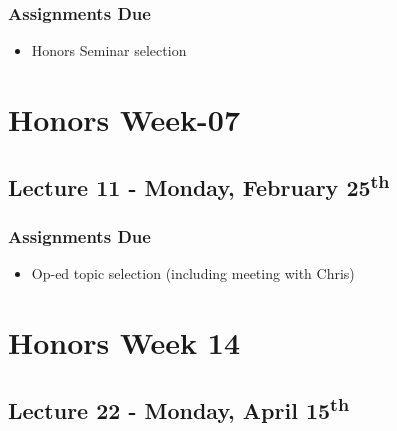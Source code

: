 \documentclass[]{book}
\providecommand{\tightlist}{%
  \setlength{\itemsep}{0pt}\setlength{\parskip}{0pt}}
\begin{document}
\hypertarget{assignments-due-9}{%
\subsubsection*{Assignments Due}\label{assignments-due-9}}

\begin{itemize}
\tightlist
\item
  Honors Seminar selection
\end{itemize}

\hypertarget{honors-week-07}{%
\section*{Honors Week-07}\label{honors-week-07}}

\hypertarget{lecture-11---monday-february-25th-1}{%
\subsection*{\texorpdfstring{Lecture 11 - Monday, February 25\textsuperscript{th}}{Lecture 11 - Monday, February 25th}}\label{lecture-11---monday-february-25th-1}}

\hypertarget{assignments-due-10}{%
\subsubsection*{Assignments Due}\label{assignments-due-10}}

\begin{itemize}
\tightlist
\item
  Op-ed topic selection (including meeting with Chris)
\end{itemize}

\hypertarget{honors-week-14}{%
\section*{Honors Week 14}\label{honors-week-14}}

\hypertarget{lecture-22---monday-april-15th-1}{%
\subsection*{\texorpdfstring{Lecture 22 - Monday, April 15\textsuperscript{th}}{Lecture 22 - Monday, April 15th}}\label{lecture-22---monday-april-15th-1}}
\end{document}
